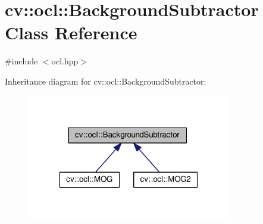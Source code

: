 \hypertarget{classcv_1_1ocl_1_1BackgroundSubtractor}{\section{cv\-:\-:ocl\-:\-:Background\-Subtractor Class Reference}
\label{classcv_1_1ocl_1_1BackgroundSubtractor}
}


{\ttfamily \#include $<$ocl.\-hpp$>$}



Inheritance diagram for cv\-:\-:ocl\-:\-:Background\-Subtractor\-:\nopagebreak
\begin{figure}[H]
\begin{center}
\leavevmode
\includegraphics[width=253pt]{classcv_1_1ocl_1_1BackgroundSubtractor__inherit__graph}
\end{center}
\end{figure}
